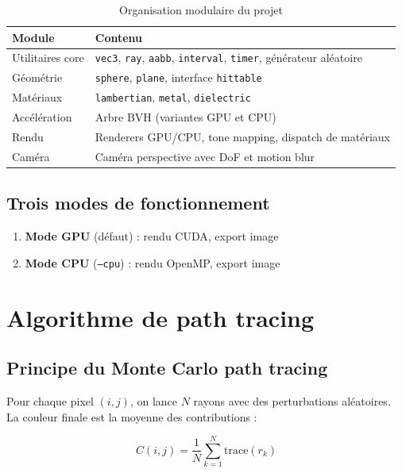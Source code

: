 \documentclass[12pt,a4paper]{article}
\begin{document}
\begin{table}[H]
\centering
\begin{tabular}{lp{9cm}}
\toprule
\textbf{Module} & \textbf{Contenu} \\
\midrule
Utilitaires core  & \texttt{vec3}, \texttt{ray}, \texttt{aabb}, \texttt{interval}, \texttt{timer}, générateur aléatoire \\
Géométrie         & \texttt{sphere}, \texttt{plane}, interface \texttt{hittable} \\
Matériaux         & \texttt{lambertian}, \texttt{metal}, \texttt{dielectric} \\
Accélération      & Arbre BVH (variantes GPU et CPU) \\
Rendu             & Renderers GPU/CPU, tone mapping, dispatch de matériaux \\
Caméra            & Caméra perspective avec DoF et motion blur \\
\bottomrule
\end{tabular}
\caption{Organisation modulaire du projet}
\end{table}

\subsection{Trois modes de fonctionnement}

\begin{enumerate}
    \item \textbf{Mode GPU} (défaut) : rendu CUDA, export image
    \item \textbf{Mode CPU} (\texttt{--cpu}) : rendu OpenMP, export image
\end{enumerate}

\section{Algorithme de path tracing}

\subsection{Principe du Monte Carlo path tracing}

Pour chaque pixel $(i, j)$, on lance $N$ rayons avec des perturbations aléatoires.
La couleur finale est la moyenne des contributions :

\[
C(i,j) = \frac{1}{N} \sum_{k=1}^{N} \text{trace}(r_k)
\]
\end{document}
